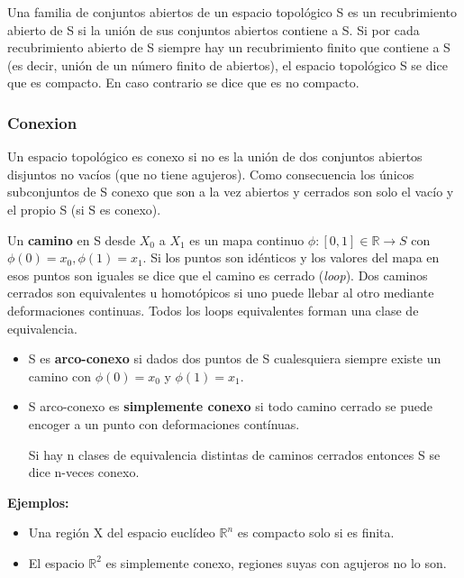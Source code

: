 \documentclass{article}
\begin{document}
Una familia de conjuntos abiertos de un espacio topológico S es un recubrimiento abierto de S si la unión de sus conjuntos abiertos contiene a S. Si por cada recubrimiento abierto de S siempre hay un recubrimiento finito que contiene a S (es decir, unión de un número finito de abiertos), el espacio topológico S se dice que es compacto. En caso contrario se dice que es no compacto.

\subsubsection{Conexion}

Un espacio topológico es conexo si no es la unión de dos conjuntos abiertos disjuntos no vacíos (que no tiene agujeros). Como consecuencia los únicos subconjuntos de S conexo que son a la vez abiertos y cerrados son solo el vacío y el propio S (si S es conexo).

\smallskip
Un \textbf{camino} en S desde $X_0$ a $X_1$  es un mapa continuo  $\phi: [0,1]\in \mathds{R}\to S$ con $\phi (0)=x_0,\phi (1)=x_1$. Si los puntos son idénticos y los valores del mapa en esos puntos son iguales se dice que el camino es cerrado (\textit{loop}). Dos caminos cerrados son equivalentes u homotópicos si uno puede llebar al otro mediante deformaciones continuas. Todos los loops equivalentes forman una clase de equivalencia.

\begin{itemize}
    \item S es \textbf{arco-conexo} si dados dos puntos de S cualesquiera siempre existe un camino con $\phi (0)=x_0$ y $\phi (1)=x_1$.

    \item S arco-conexo es \textbf{simplemente conexo} si todo camino cerrado se puede encoger a un punto con deformaciones contínuas.

    Si hay n clases de equivalencia distintas de caminos cerrados entonces S se dice n-veces conexo.
\end{itemize}

\textbf{Ejemplos:}

\begin{itemize}
    \item Una región X del espacio euclídeo $\mathds{R}^n$ es compacto solo si es finita.
    \item El espacio $\mathds{R}^2$ es simplemente conexo, regiones suyas con agujeros no lo son.
\end{itemize}
\end{document}
